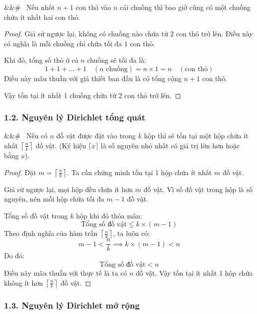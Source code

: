 \documentclass[12pt,a4paper]{article}
\newenvironment{mytheorem}[1][]
  {\begin{mdframed}[style=theoremstyle]\noindent\ifx&#1&#\else\textbf{#1}\ \fi\ignorespaces}
  {\end{mdframed}}
\theoremstyle{definition}
\begin{document}
\begin{mytheorem}
Nếu nhốt $n+1$ con thỏ vào $n$ cái chuồng thì bao giờ cũng có một chuồng chứa ít nhất hai con thỏ.
\end{mytheorem}

\begin{proof}
Giả sử ngược lại, không có chuồng nào chứa từ $2$ con thỏ trở lên. Điều này có nghĩa là mỗi chuồng chỉ chứa tối đa $1$ con thỏ.

\noindent Khi đó, tổng số thỏ ở cả $n$ chuồng sẽ tối đa là:
\[
1 + 1 + \dots + 1 \quad (n \text{ chuồng}) = n \times 1 = n \quad (\text{con thỏ})
\]
Điều này mâu thuẫn với giả thiết ban đầu là có tổng cộng $n+1$ con thỏ.

\noindent Vậy tồn tại ít nhất 1 chuồng chứa từ 2 con thỏ trở lên.
\end{proof}

\subsubsection*{1.2. Nguyên lý Dirichlet tổng quát}

\begin{mytheorem}
Nếu có $n$ đồ vật được đặt vào trong $k$ hộp thì sẽ tồn tại một hộp chứa ít nhất $\left\lceil \frac{n}{k} \right\rceil$ đồ vật. (Ký hiệu $\lceil x \rceil$ là số nguyên nhỏ nhất có giá trị lớn hơn hoặc bằng $x$).
\end{mytheorem}

\begin{proof}
Đặt $m = \left\lceil \frac{n}{k} \right\rceil$. Ta cần chứng minh tồn tại 1 hộp chứa ít nhất $m$ đồ vật.

\noindent Giả sử ngược lại, mọi hộp đều chứa ít hơn $m$ đồ vật. Vì số đồ vật trong hộp là số nguyên, nên mỗi hộp chứa tối đa $m-1$ đồ vật.

\noindent Tổng số đồ vật trong $k$ hộp khi đó thỏa mãn:
\[
\text{Tổng số đồ vật} \le k \times (m - 1)
\]
Theo định nghĩa của hàm trần $\left\lceil \frac{n}{k} \right\rceil$, ta luôn có:
\[
m - 1 < \frac{n}{k} \implies k \times (m - 1) < n
\]
Do đó:
\[
\text{Tổng số đồ vật} < n
\]
Điều này mâu thuẫn với thực tế là ta có $n$ đồ vật. Vậy tồn tại ít nhất 1 hộp chứa không ít hơn $\left\lceil \frac{n}{k} \right\rceil$ đồ vật.
\end{proof}

\subsubsection*{1.3. Nguyên lý Dirichlet mở rộng}
\end{document}
